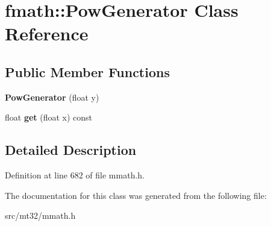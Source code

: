 \hypertarget{classfmath_1_1PowGenerator}{\section{fmath\-:\-:Pow\-Generator Class Reference}
\label{classfmath_1_1PowGenerator}
}
\subsection*{Public Member Functions}
\begin{DoxyCompactItemize}
\item 
\hypertarget{classfmath_1_1PowGenerator_ad264a37bf0972ce6ec6b8b51725ea743}{{\bfseries Pow\-Generator} (float y)}\label{classfmath_1_1PowGenerator_ad264a37bf0972ce6ec6b8b51725ea743}

\item 
\hypertarget{classfmath_1_1PowGenerator_a9b1ed1a1be122e02377c59d7e5d87f37}{float {\bfseries get} (float x) const }\label{classfmath_1_1PowGenerator_a9b1ed1a1be122e02377c59d7e5d87f37}

\end{DoxyCompactItemize}


\subsection{Detailed Description}


Definition at line 682 of file mmath.\-h.



The documentation for this class was generated from the following file\-:\begin{DoxyCompactItemize}
\item 
src/mt32/mmath.\-h\end{DoxyCompactItemize}
